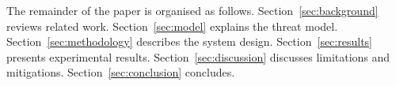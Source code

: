 \documentclass[conference]{IEEEtran}
\begin{document}



The remainder of the paper is organised as follows. Section~\ref{sec:background} reviews related work. Section~\ref{sec:model} explains the threat model. Section~\ref{sec:methodology} describes the system design. Section~\ref{sec:results} presents experimental results. Section~\ref{sec:discussion} discusses limitations and mitigations. Section~\ref{sec:conclusion} concludes.




\end{document}
